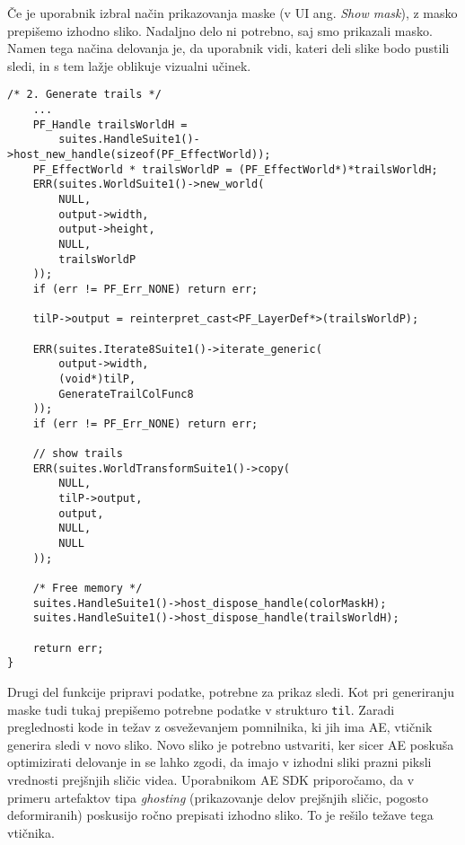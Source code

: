 \documentclass[a4paper, 12pt]{book}
\begin{document}
Če je uporabnik izbral način prikazovanja maske (v UI ang. {\it Show mask}), z masko prepišemo izhodno sliko.
Nadaljno delo ni potrebno, saj smo prikazali masko.
Namen tega načina delovanja je, da uporabnik vidi, kateri deli slike bodo pustili sledi, in s tem lažje oblikuje vizualni učinek.

\begin{verbatim}
/* 2. Generate trails */
    ...
    PF_Handle trailsWorldH = 
        suites.HandleSuite1()->host_new_handle(sizeof(PF_EffectWorld));
    PF_EffectWorld * trailsWorldP = (PF_EffectWorld*)*trailsWorldH;
    ERR(suites.WorldSuite1()->new_world(
        NULL,
        output->width,
        output->height,
        NULL,
        trailsWorldP
    ));
    if (err != PF_Err_NONE) return err;

    tilP->output = reinterpret_cast<PF_LayerDef*>(trailsWorldP);

    ERR(suites.Iterate8Suite1()->iterate_generic(
        output->width,
        (void*)tilP,
        GenerateTrailColFunc8
    ));
    if (err != PF_Err_NONE) return err;
    
    // show trails
    ERR(suites.WorldTransformSuite1()->copy(
        NULL,
        tilP->output,
        output,
        NULL,
        NULL
    ));

    /* Free memory */
    suites.HandleSuite1()->host_dispose_handle(colorMaskH);
    suites.HandleSuite1()->host_dispose_handle(trailsWorldH);
    
    return err;
}
\end{verbatim}

Drugi del funkcije pripravi podatke, potrebne za prikaz sledi.
Kot pri generiranju maske tudi tukaj prepišemo potrebne podatke v strukturo \texttt{til}.
Zaradi preglednosti kode in težav z osveževanjem pomnilnika, ki jih ima AE, vtičnik generira sledi v novo sliko.
Novo sliko je potrebno ustvariti, ker sicer AE poskuša optimizirati delovanje in se lahko zgodi, da imajo v izhodni sliki prazni piksli vrednosti prejšnjih sličic videa.
Uporabnikom AE SDK priporočamo, da v primeru artefaktov tipa {\it ghosting} (prikazovanje delov prejšnjih sličic, pogosto deformiranih) poskusijo ročno prepisati izhodno sliko.
To je rešilo težave tega vtičnika.
\end{document}
